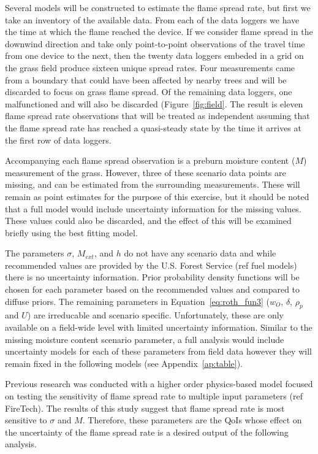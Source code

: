 \documentclass[11pt]{article}
\begin{document}
Several models will be constructed to estimate the flame spread rate, but first we take an inventory of the available data. From each of the data loggers we have the time at which the flame reached the device. If we consider flame spread in the downwind direction and take only point-to-point observations of the travel time from one device to the next, then the twenty data loggers embeded in a grid on the grass field produce sixteen unique spread rates. Four measurements came from a boundary that could have been affected by nearby trees and will be discarded to focus on grass flame spread. Of the remaining data loggers, one malfunctioned and will also be discarded (Figure~\ref{fig:field}. The result is eleven flame spread rate observations that will be treated as independent assuming that the flame spread rate has reached a quasi-steady state by the time it arrives at the first row of data loggers.

Accompanying each flame spread observation is a preburn moisture content ($M$) measurement of the grass. However, three of these scenario data points are missing, and can be estimated from the surrounding measurements. These will remain as point estimates for the purpose of this exercise, but it should be noted that a full model would include uncertainty information for the missing values. These values could also be discarded, and the effect of this will be examined briefly using the best fitting model.

The parameters $\sigma$, $M_{ext}$, and $h$ do not have any scenario data and while recommended values are provided by the U.S. Forest Service (ref fuel models) there is no uncertainty information. Prior probability density functions will be chosen for each parameter based on the recommended values and compared to diffuse priors. The remaining parameters in Equation~\ref{eq:roth_fun3} ($w_O$, $\delta$, $\rho_p$ and $U$) are irreducable and scenario specific. Unfortunately, these are only available on a field-wide level with limited uncertainty information. Similar to the missing moisture content scenario parameter, a full analysis would include uncertainty models for each of these parameters from field data however they will remain fixed in the following models (see Appendix~\ref{ap:table}).

Previous research was conducted with a higher order physics-based model focused on testing the sensitivity of flame spread rate to multiple input parameters (ref FireTech). The results of this study suggest that flame spread rate is most sensitive to $\sigma$ and $M$. Therefore, these parameters are the QoIs whose effect on the uncertainty of the flame spread rate is a desired output of the following analysis.
\end{document}
